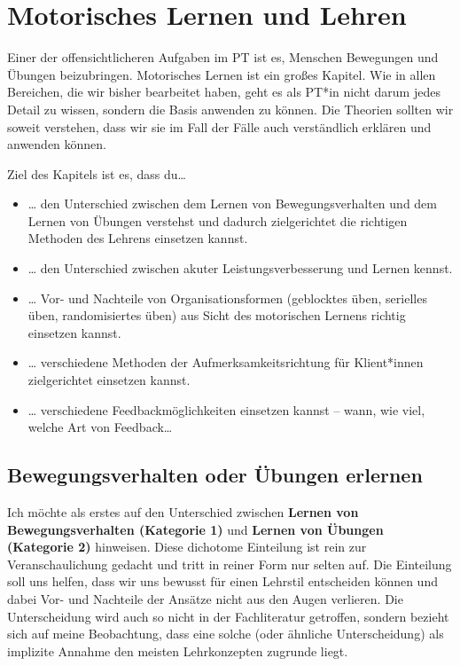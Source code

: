 \documentclass[
  letterpaper,
  DIV=11,
  numbers=noendperiod]{scrreprt}
\providecommand{\tightlist}{%
  \setlength{\itemsep}{0pt}\setlength{\parskip}{0pt}}
\begin{document}

\chapter{Motorisches Lernen und Lehren}\label{sec-motorlearning}

Einer der offensichtlicheren Aufgaben im PT ist es, Menschen Bewegungen
und Übungen beizubringen. Motorisches Lernen ist ein großes Kapitel. Wie
in allen Bereichen, die wir bisher bearbeitet haben, geht es als PT*in
nicht darum jedes Detail zu wissen, sondern die Basis anwenden zu
können. Die Theorien sollten wir soweit verstehen, dass wir sie im Fall
der Fälle auch verständlich erklären und anwenden können.

Ziel des Kapitels ist es, dass du\ldots{}

\begin{itemize}
\tightlist
\item
  \ldots{} den Unterschied zwischen dem Lernen von Bewegungsverhalten
  und dem Lernen von Übungen verstehst und dadurch zielgerichtet die
  richtigen Methoden des Lehrens einsetzen kannst.
\item
  \ldots{} den Unterschied zwischen akuter Leistungsverbesserung und
  Lernen kennst.
\item
  \ldots{} Vor- und Nachteile von Organisationsformen (geblocktes üben,
  serielles üben, randomisiertes üben) aus Sicht des motorischen Lernens
  richtig einsetzen kannst.
\item
  \ldots{} verschiedene Methoden der Aufmerksamkeitsrichtung für
  Klient*innen zielgerichtet einsetzen kannst.
\item
  \ldots{} verschiedene Feedbackmöglichkeiten einsetzen kannst -- wann,
  wie viel, welche Art von Feedback\ldots{}
\end{itemize}

\section{Bewegungsverhalten oder Übungen
erlernen}\label{bewegungsverhalten-oder-uxfcbungen-erlernen}

Ich möchte als erstes auf den Unterschied zwischen \textbf{Lernen von
Bewegungsverhalten (Kategorie 1)} und \textbf{Lernen von Übungen
(Kategorie 2)} hinweisen. Diese dichotome Einteilung ist rein zur
Veranschaulichung gedacht und tritt in reiner Form nur selten auf. Die
Einteilung soll uns helfen, dass wir uns bewusst für einen Lehrstil
entscheiden können und dabei Vor- und Nachteile der Ansätze nicht aus
den Augen verlieren. Die Unterscheidung wird auch so nicht in der
Fachliteratur getroffen, sondern bezieht sich auf meine Beobachtung,
dass eine solche (oder ähnliche Unterscheidung) als implizite Annahme
den meisten Lehrkonzepten zugrunde liegt.
\end{document}

